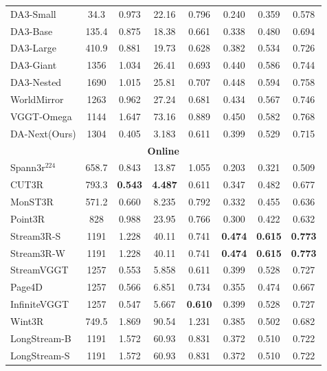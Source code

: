 \documentclass{llmxive}
\providecommand{\ours}{DA-Next\xspace}
\begin{document}
\begin{table}[t]
{\begin{tabular}{l c >{\columncolor{subcol}}c >{\columncolor{subcol}}c >{\columncolor{subcol}}c >{\columncolor{subcol}}c >{\columncolor{subcol}}c >{\columncolor{subcol}}c}
 DA3-Small & 34.3 & 0.973 & 22.16 & 0.796 & 0.240 & 0.359 & 0.578 \\
 DA3-Base & 135.4 & 0.875 & 18.38 & 0.661 & 0.338 & 0.480 & 0.694 \\
 DA3-Large & 410.9 & 0.881 & 19.73 & 0.628 & 0.382 & 0.534 & 0.726 \\
 DA3-Giant & 1356 & 1.034 & 26.41 & 0.693 & 0.440 & 0.586 & 0.744 \\
 DA3-Nested & 1690 & 1.015 & 25.81 & 0.707 & 0.448 & 0.594 & 0.758 \\
 WorldMirror & 1263 & 0.962 & 27.24 & 0.681 & 0.434 & 0.567 & 0.746 \\
 VGGT-Omega & 1144 & 1.647 & 73.16 & 0.889 & 0.450 & 0.582 & 0.768 \\
 \ours (Ours) & 1304 & 0.405 & 3.183 & 0.611 & 0.399 & 0.529 & 0.715 \\
\midrule
\multicolumn{8}{c}{\cellcolor{catgray}\textbf{Online}} \\
\midrule
 Spann3r$^{224}$ & 658.7 & 0.843 & 13.87 & 1.055 & 0.203 & 0.321 & 0.509 \\
 CUT3R & 793.3 & \textbf{0.543} & \textbf{4.487} & 0.611 & 0.347 & 0.482 & 0.677 \\
 MonST3R & 571.2 & 0.660 & 8.235 & 0.792 & 0.332 & 0.455 & 0.636 \\
 Point3R & 828 & 0.988 & 23.95 & 0.766 & 0.300 & 0.422 & 0.632 \\
 Stream3R-S & 1191 & 1.228 & 40.11 & 0.741 & \cellcolor{thirdyellow}\textbf{0.474} & \cellcolor{secondorange}\textbf{0.615} & \cellcolor{secondorange}\textbf{0.773} \\
 Stream3R-W & 1191 & 1.228 & 40.11 & 0.741 & \cellcolor{thirdyellow}\textbf{0.474} & \cellcolor{secondorange}\textbf{0.615} & \cellcolor{secondorange}\textbf{0.773} \\
 StreamVGGT & 1257 & 0.553 & 5.858 & \cellcolor{thirdyellow}0.611 & 0.399 & 0.528 & 0.727 \\
 Page4D & 1257 & 0.566 & 6.851 & 0.734 & 0.355 & 0.474 & 0.667 \\
 InfiniteVGGT & 1257 & 0.547 & 5.667 & \cellcolor{secondorange}\textbf{0.610} & 0.399 & 0.528 & 0.727 \\
 Wint3R & 749.5 & 1.869 & 90.54 & 1.231 & 0.385 & 0.502 & 0.682 \\
 LongStream-B & 1191 & 1.572 & 60.93 & 0.831 & 0.372 & 0.510 & 0.722 \\
 LongStream-S & 1191 & 1.572 & 60.93 & 0.831 & 0.372 & 0.510 & 0.722 \\

\end{tabular}}
\end{table}
\end{document}
